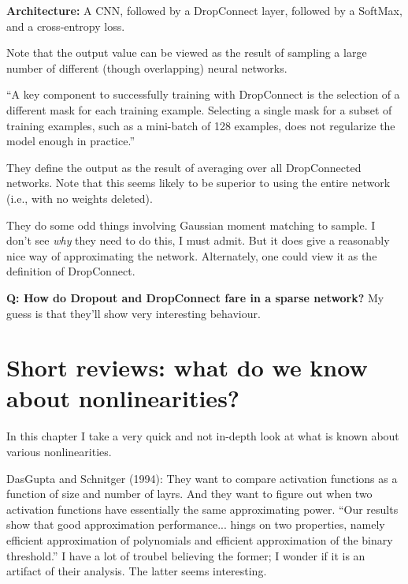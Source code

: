 \documentclass[12pt]{report}
\begin{document}
\textbf{Architecture:} A CNN, followed by a DropConnect layer,
followed by a SoftMax, and a cross-entropy loss.

Note that the output value can be viewed as the result of sampling a
large number of different (though overlapping) neural networks.

``A key component to successfully training with DropConnect is the
selection of a different mask for each training example.  Selecting a
single mask for a subset of training examples, such as a mini-batch of
128 examples, does not regularize the model enough in practice.''

They define the output as the result of averaging over all
DropConnected networks.  Note that this seems likely to be superior to
using the entire network (i.e., with no weights deleted).

They do some odd things involving Gaussian moment matching to sample.
I don't see \emph{why} they need to do this, I must admit.  But it
does give a reasonably nice way of approximating the network.
Alternately, one could view it as the definition of DropConnect.


\textbf{Q: How do Dropout and DropConnect fare in a sparse network?}
My guess is that they'll show very interesting behaviour.

\chapter{Short reviews: what do we know about nonlinearities?}

In this chapter I take a very quick and not in-depth look at what is
known about various nonlinearities.

DasGupta and Schnitger (1994): They want to compare activation
functions as a function of size and number of layrs.  And they want to
figure out when two activation functions have essentially the same
approximating power. ``Our results show that good approximation
performance... hings on two properties, namely efficient approximation
of polynomials and efficient approximation of the binary threshold.''
I have a lot of troubel believing the former; I wonder if it is an
artifact of their analysis.  The latter seems interesting.
\end{document}
